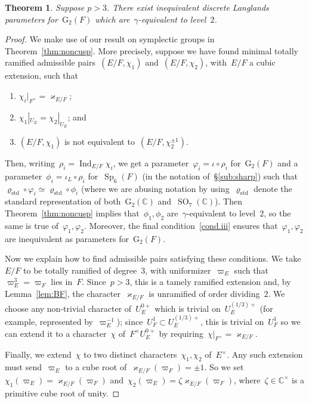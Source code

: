 \documentclass[12pt]{amsart}
\newcommand{\Ind}{\operatorname{Ind}}
\newcommand{\SO}{\operatorname{SO}}
\newcommand{\G}{\mathrm{G}}
\newcommand{\Sp}{\operatorname{Sp}}
\def\rhostd{\varrho_{\mathrm{std}}} %
\newtheorem{thm}{Theorem}[section]
\newtheorem{thm}[equation]{Theorem}
\begin{document}
\begin{thm}\label{G2}
Suppose $p > 3$.  There exist inequivalent discrete Langlands parameters for~$\G_2(F)$ which are~$\gamma$-equivalent to level~$2$.
\end{thm}

\begin{proof} 
We make use of our result on symplectic groups in Theorem~\ref{thm:noncusp}. More precisely, suppose we have found minimal totally ramified admissible pairs~$(E/F,\chi_1)$ and~$(E/F,\chi_2)$, with~$E/F$ a cubic extension, such that
\begin{enumerate}
\item $\chi_i|_{F^\times}=\varkappa_{E/F}$; 
\item $\chi_1|_{U_E}=\chi_2|_{U_E}$; and
\item\label{cond.iii} $(E/F,\chi_1)$ is not equivalent to~$(E/F,\chi_2^{\pm 1})$.
\end{enumerate}
Then, writing~$\rho_i=\Ind_{E/F}\chi_i$, we get a parameter~$\varphi_i=\iota\circ\rho_i$ for~$\G_2(F)$ and a parameter~$\phi_i=\iota_L\circ\rho_i$ for~$\Sp_6(F)$ (in the notation of~\S\ref{sub:sharp}) such that~$\rhostd\circ\varphi_i \simeq \rhostd\circ\phi_i$ (where we are abusing notation by using~$\rhostd$ denote the standard representation of both~$\G_2(\mathbb{C})$ and~$\SO_7(\mathbb{C})$). Then Theorem~\ref{thm:noncusp} implies that~$\phi_1,\phi_2$ are~$\gamma$-equivalent to level~$2$, so the same is true of~$\varphi_1,\varphi_2$. Moreover, the final condition~\ref{cond.iii} ensures that~$\varphi_1,\varphi_2$ are inequivalent as parameters for~$\G_2(F)$.

Now we explain how to find admissible pairs satisfying these conditions. We take~$E/F$ to be totally ramified of degree~$3$, with uniformizer~$\varpi_E$ such that~$\varpi_E^3=\varpi_F$ lies in~$F$. Since~$p>3$, this is a tamely ramified extension and, by Lemma~\ref{lem:BF}, the character~$\varkappa_{E/F}$ is unramified of order dividing~$2$. %
 We choose any non-trivial character of~$U_E^{0+}$ which is trivial on~$U_E^{(1/3)+}$ (for example, represented by~$\varpi_E^{-1}$); since~$U_F^1\subset U_E^{(1/3)+}$, this is trivial on~$U_F^1$ so we can extend it to a character~$\chi$ of~$F^\times U_E^{0+}$ by requiring~$\chi|_{F^\times}=\varkappa_{E/F}$. 

Finally, we extend~$\chi$ to two distinct characters~$\chi_1,\chi_2$ of~$E^\times$. Any such extension must send~$\varpi_E$ to a cube root of~$\varkappa_{E/F}(\varpi_F)=\pm 1$. So we set~$\chi_1(\varpi_E)=\varkappa_{E/F}(\varpi_F)$ and~$\chi_2(\varpi_E)=\zeta \varkappa_{E/F}(\varpi_F)$, where~$\zeta\in\mathbb{C}^\times$ is a primitive cube root of unity. 


\end{proof}
\end{document}
